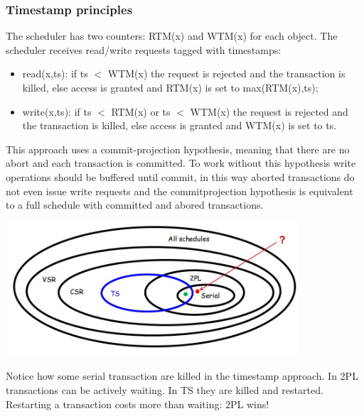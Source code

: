\subsubsection{Timestamp principles}
The scheduler has two counters: RTM(x) and WTM(x) for each object.\newline
\newline
The scheduler receives read/write requests tagged with timestamps:
\begin{itemize}
    \item read(x,ts): if ts $<$ WTM(x) the request is rejected and the transaction is killed, else access is granted and RTM(x) is set to max(RTM(x),ts);
    \item write(x,ts): if ts $<$ RTM(x) or ts $<$ WTM(x) the request is rejected and the transaction is killed, else access is granted and WTM(x) is set to ts.
\end{itemize}
This approach uses a commit-projection hypothesis, meaning that there are no abort and each transaction is committed.\newline
To work without this hypothesis write operations should be buffered until commit, in this way aborted transactions do not even issue write requests and the commitprojection hypothesis is equivalent to a full schedule with committed and abored transactions.
\begin{center}
    \includegraphics[height=5cm]{../arguments/tsand2pl.JPG}
\end{center}
Notice how some serial transaction are killed in the timestamp approach.\newline
In 2PL transactions can be actively waiting. In TS they are
killed and restarted. Restarting a transaction costs more than waiting: 2PL wins!
